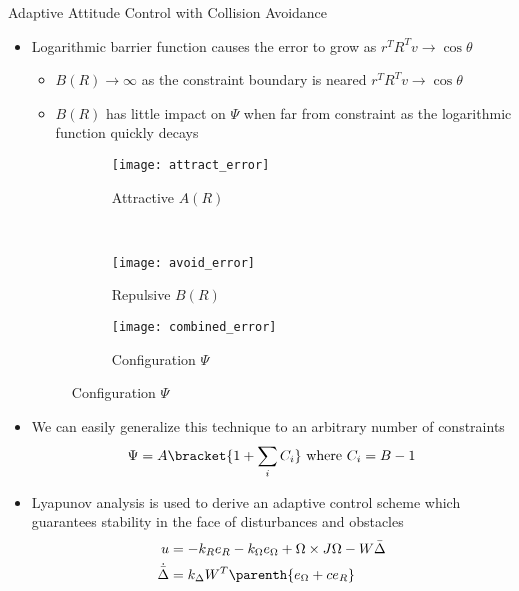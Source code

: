\documentclass[final, usenames, dvipsnames]{beamer}
\newlength{\twocolwidth}
\begin{document}
\begin{frame}[t]
\begin{columns}[T,onlytextwidth]
\begin{column}{\twocolwidth}
\begin{block}{Adaptive Attitude Control with Collision Avoidance}
	\begin{itemize}
		\item Logarithmic barrier function causes the error to grow as \( r^T R^T v \to \cos \theta \)
			\begin{itemize}
				\item \( B(R) \to \infty \) as the constraint boundary is neared \( r^T R^T v \to \cos \theta \)
				\item \( B(R) \) has little impact on \( \Psi \) when far from constraint as the logarithmic function quickly decays
			\end{itemize}
		\begin{figure} 
			\centering 
        	\begin{subfigure}[htbp]{0.3\columnwidth} 
        		\texttt{[image: attract\_error]} 
        		\caption*{Attractive \( A(R) \) } \label{fig:attract_error} 
        	\end{subfigure}~ %
        	\begin{subfigure}[htbp]{0.3\columnwidth} 
        		\texttt{[image: avoid\_error]} 
        		\caption*{Repulsive \( B(R) \)} \label{fig:avoid_error} 
        	\end{subfigure}
        	\begin{subfigure}[htbp]{0.3\columnwidth} 
        		\texttt{[image: combined\_error]} 
        		\caption*{Configuration \( \Psi \)} \label{fig:combined_error} 
        	\end{subfigure}
        \end{figure}
        \item We can easily generalize this technique to an arbitrary number of constraints 
			\begin{align*}
				\Psi = A \bracket{1 + \sum_i C_i} \text{ where } C_i = B - 1
			\end{align*}
		\item Lyapunov analysis is used to derive an adaptive control scheme which guarantees stability in the face of disturbances and obstacles
		\begin{align*}
			u &= - k_R e_R - k_\Omega e_\Omega + \Omega \times J \Omega - W \bar{\Delta} \\
			\dot{\bar{\Delta}} &= k_\Delta W^T \parenth{e_\Omega + c e_R} 
		\end{align*}
	\end{itemize}
\end{block} %


\end{column}
\end{columns}
\end{frame}
\end{document}
